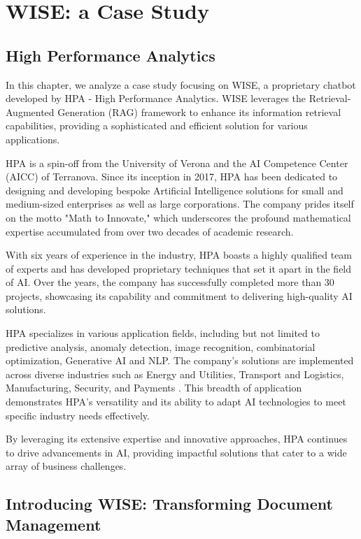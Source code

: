 \section{WISE: a Case Study}

\subsection{High Performance Analytics}

In this chapter, we analyze a case study focusing on WISE, a proprietary chatbot developed by HPA - High Performance Analytics. WISE leverages the Retrieval-Augmented Generation (RAG) framework to enhance its information retrieval capabilities, providing a sophisticated and efficient solution for various applications.

HPA is a spin-off from the University of Verona and the AI Competence Center (AICC) of Terranova. Since its inception in 2017, HPA has been dedicated to designing and developing bespoke Artificial Intelligence solutions for small and medium-sized enterprises as well as large corporations. The company prides itself on the motto "Math to Innovate," which underscores the profound mathematical expertise accumulated from over two decades of academic research.

With six years of experience in the industry, HPA boasts a highly qualified team of experts and has developed proprietary techniques that set it apart in the field of AI. Over the years, the company has successfully completed more than 30 projects, showcasing its capability and commitment to delivering high-quality AI solutions.

HPA specializes in various application fields, including but not limited to predictive analysis, anomaly detection, image recognition, combinatorial optimization, Generative AI and NLP. The company's solutions are implemented across diverse industries such as Energy and Utilities, Transport and Logistics, Manufacturing, Security, and Payments \cite{hpa2024}. This breadth of application demonstrates HPA's versatility and its ability to adapt AI technologies to meet specific industry needs effectively.

By leveraging its extensive expertise and innovative approaches, HPA continues to drive advancements in AI, providing impactful solutions that cater to a wide array of business challenges.

\subsection{Introducing WISE: Transforming Document Management}

